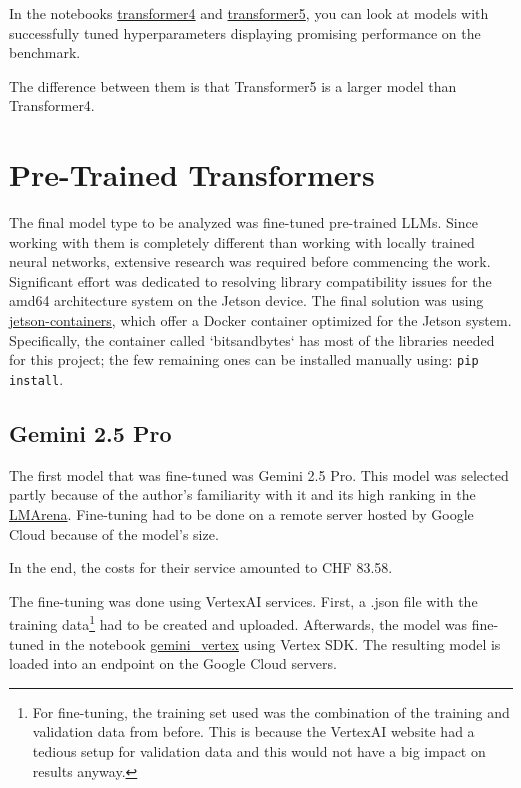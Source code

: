 \documentclass{article}
\begin{document}
In the notebooks \href{https://github.com/AntonStantan/matura/blob/main/transformer/transformer4.ipynb}{transformer4} and \href{https://github.com/AntonStantan/matura/blob/main/transformer/transformer5.ipynb}{transformer5}, you can look at models with successfully tuned hyperparameters displaying promising performance on the benchmark.

The difference between them is that Transformer5 is a larger model than Transformer4.

\section{Pre-Trained Transformers}

The final model type to be analyzed was fine-tuned pre-trained LLMs. Since working with them is completely different than working with locally trained neural networks, extensive research was required before commencing the work.
\\[1em]
Significant effort was dedicated to resolving library compatibility issues for the amd64 architecture system on the Jetson device. The final solution was using \href{https://github.com/dusty-nv/jetson-containers}{jetson-containers}, which offer a Docker container optimized for the Jetson system. Specifically, the container called `bitsandbytes` has most of the libraries needed for this project; the few remaining ones can be installed manually using: \texttt{pip install}.


\subsection{Gemini 2.5 Pro}
The first model that was fine-tuned was Gemini 2.5 Pro. This model was selected partly because of the author's familiarity with it and its high ranking in the \href{https://lmarena.ai/leaderboard}{LMArena}.
Fine-tuning had to be done on a remote server hosted by Google Cloud because of the model's size.

In the end, the costs for their service amounted to CHF 83.58.

The fine-tuning was done using VertexAI services. First, a .json file with the training data\footnote{For fine-tuning, the training set used was the combination of the training and validation data from before. This is because the VertexAI website had a tedious setup for validation data and this would not have a big impact on results anyway.} had to be created and uploaded. Afterwards, the model was fine-tuned in the notebook \href{https://github.com/AntonStantan/matura/blob/main/pre-trained-tranformers/gemini_vertex.ipynb}{gemini\_vertex} using Vertex SDK. The resulting model is loaded into an endpoint on the Google Cloud servers.
\end{document}
